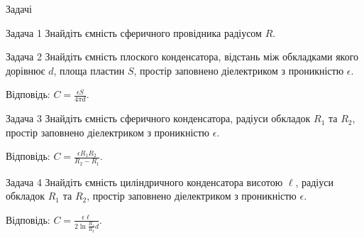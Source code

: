 \documentclass[onlytextwidth]{beamer}
\begin{document}
\begin{frame}{Задачі}{}\small
	\begin{exampleblock}{Задача 1}
		Знайдіть ємність сферичного провідника радіусом $R$.
	\end{exampleblock}
	\begin{exampleblock}{Задача 2}
		Знайдіть ємність плоского конденсатора, відстань між обкладками якого дорівнює $d$,
		площа пластин $S$, простір заповнено діелектриком з проникністю $\epsilon$.

		\bigskip

		Відповідь: $C = \frac{\epsilon S}{4\pi d}$.
	\end{exampleblock}
	\begin{exampleblock}{Задача 3}
		Знайдіть ємність сферичного конденсатора, радіуси обкладок $R_1$ та $R_2$, простір
		заповнено діелектриком з проникністю $\epsilon$.

		\bigskip

		Відповідь: $C = \frac{\epsilon R_1R_2}{R_2 - R_1}$.
	\end{exampleblock}
	\begin{exampleblock}{Задача 4}
		Знайдіть ємність циліндричного конденсатора висотою $\ell$, радіуси обкладок $R_1$ та
		$R_2$, простір
		заповнено діелектриком з проникністю $\epsilon$.

		\bigskip

		Відповідь: $C = \frac{\epsilon \ell}{2\ln\frac{R_1}{R_2} d}$.
	\end{exampleblock}
\end{frame}
\end{document}
